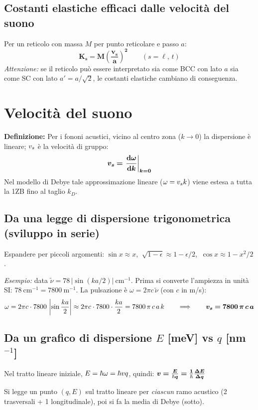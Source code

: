 \subsection{Costanti elastiche efficaci dalle velocità del suono}
Per un reticolo con massa $M$ per punto reticolare e passo $a$:
\[ \bm{K_s = M\left(\frac{v_s}{a}\right)^{\!2}} \qquad (s=\ell,\,t) \]
\textit{Attenzione:} se il reticolo può essere interpretato sia come BCC con lato $a$ sia come SC con lato $a'=a/\sqrt2$, le costanti elastiche cambiano di conseguenza.


\newpage 
\section{Velocità del suono}

\textbf{Definizione:} Per i fononi acustici, vicino al centro zona ($k\to0$) la dispersione è lineare; $v_s$ è la velocità di gruppo:
\[ \bm{v_s = \left.\frac{\mathrm{d}\omega}{\mathrm{d} k}\right|_{k=0}} \]
Nel modello di Debye tale approssimazione lineare ($\omega=v_s k$) viene estesa a tutta la 1ZB fino al taglio $k_D$.

\subsection{Da una legge di dispersione trigonometrica (sviluppo in serie)}
Espandere per piccoli argomenti: $\sin x \approx x$, $\ \sqrt{1-\epsilon}\approx 1-\epsilon/2$, $\ \cos x \approx 1-x^2/2$.

\textit{Esempio:} data $\tilde\nu = 78\,|\sin(ka/2)|\ \text{cm}^{-1}$. Prima si converte l'ampiezza in unità SI: $78\ \text{cm}^{-1} = 7800\ \text{m}^{-1}$. La pulsazione è $\omega = 2\pi c\,\tilde\nu$ (con $c$ in m/s):
\[ \omega = 2\pi c\cdot 7800\,\left|\sin\frac{ka}{2}\right| \approx 2\pi c\cdot 7800\cdot\frac{ka}{2} = 7800\,\pi\,c\,a\,k
   \qquad\Longrightarrow\qquad \bm{v_s = 7800\,\pi\,c\,a} \]

\subsection{Da un grafico di dispersione $E$ [meV] vs $q$ [nm$^{-1}$]}
Nel tratto lineare iniziale, $E=\hbar\omega = \hbar v q$, quindi: $\bm{v = \frac{E}{\hbar q} = \frac{1}{\hbar}\frac{\Delta E}{\Delta q}}$

Si legge un punto $(q,E)$ sul tratto lineare per \emph{ciascun} ramo acustico (2 trasversali + 1 longitudinale), poi si fa la media di Debye (sotto).

